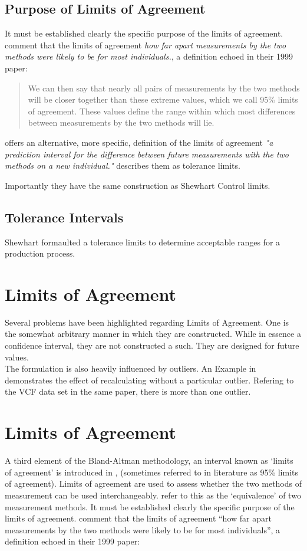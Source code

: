 \documentclass{report}
\begin{document}
	\subsection{Purpose of Limits of Agreement} It must be established
	clearly the specific purpose of the limits of agreement.
	\citet*{BA95} comment that the limits of agreement \emph{how far
		apart measurements by the two methods were likely to be for most
		individuals.}, a definition echoed in their 1999 paper:
	\begin{quote} We can then say that nearly all pairs
		of measurements by the two methods will be closer together than
		these extreme values, which we call 95\% limits of agreement.
		These values define the range within which most differences
		between measurements by the two methods will lie\citep{BA99}.
	\end{quote}
	\citet{BXC} offers an alternative, more specific,  definition of
	the limits of agreement \emph{"a prediction interval for the
		difference between future measurements with the two methods on a
		new individual."} \citet{luiz} describes them as tolerance limits.
	
	Importantly they have the same construction as Shewhart Control
	limits.
	\subsection{Tolerance Intervals}
	
	Shewhart formaulted a tolerance limits to determine acceptable
	ranges for a production process.
	
	
	\section{Limits of Agreement}
	
	Several problems have been highlighted regarding Limits of
	Agreement. One is the somewhat arbitrary manner in which they are
	constructed. While in essence a confidence interval, they are not
	constructed a such. They are designed for future values.
	\\
	The formulation is also heavily influenced by outliers. An Example
	in \citet*{BA83} demonstrates the effect of recalculating without
	a particular outlier. Refering to the VCF data set in the same
	paper, there is more than one outlier.
	
	
	\section{Limits of Agreement}
	A third element of the Bland-Altman methodology, an interval known
	as `limits of agreement' is introduced in \citet*{BA86},
	(sometimes referred to in literature as 95\% limits of agreement).
	Limits of agreement are used to assess whether the two methods of
	measurement can be used interchangeably. \citet{BA86} refer to
	this as the `equivalence' of two measurement methods. It must be
	established clearly the specific purpose of the limits of
	agreement. \citet*{BA95} comment that the limits of agreement
	``how far apart measurements by the two methods were likely to be
	for most individuals'', a definition echoed in their 1999 paper:
	
\end{document}
